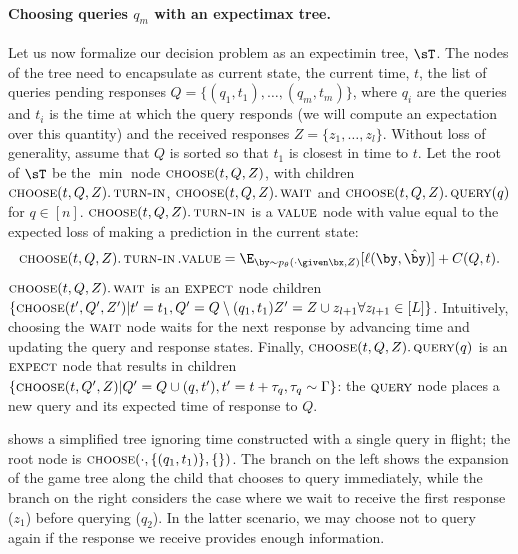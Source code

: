 \paragraph{Choosing queries $q_m$ with an expectimax tree.}
Let us now formalize our decision problem as an expectimin tree, $\sT$.
The nodes of the tree need to encapsulate as current state, the current time, $t$, the list of queries pending responses $Q = \{(q_1, t_1), \ldots, (q_m, t_m)\}$, where $q_i$ are the queries and $t_i$ is the time at which the query responds (we will compute an expectation over this quantity) and the received responses $Z = \{z_1, \ldots, z_l\}$.
Without loss of generality, assume that $Q$ is sorted so that $t_1$ is closest in time to $t$.
Let the root of $\sT$ be the $\min$ node $\operatorname{\textsc{choose}}(t, Q, Z)$, 
with children $\operatorname{\textsc{choose}}(t, Q, Z).\operatorname{\textsc{turn-in}}$, $\operatorname{\textsc{choose}}(t, Q, Z).\operatorname{\textsc{wait}}$ and $\operatorname{\textsc{choose}}(t, Q, Z).\operatorname{\textsc{query}}(q)$ for $q \in [n]$.
$\operatorname{\textsc{choose}}(t, Q, Z).\operatorname{\textsc{turn-in}}$ is a $\textsc{value}$ node with value equal to the expected loss of making a prediction in the current state:
\[
\scchoose(t, Q, Z).\turnin.\scvalue 
= \E_{\by \sim \p(\cdot \given \bx, Z)}[\ell(\by, \byt)] + C(Q, t).
\]
$\operatorname{\textsc{choose}}(t, Q, Z).\operatorname{\textsc{wait}}$ is an $\textsc{expect}$ node children $\{\operatorname{\textsc{choose}}(t', Q', Z') | t' = t_1, Q' = Q \setminus (q_1, t_1) Z' = Z \cup {z_{l+1}} \forall z_{l+1} \in [L]\}$.
Intuitively, choosing the $\operatorname{\textsc{wait}}$ node waits for the next response by advancing time and updating the query and response states.
Finally,
$\operatorname{\textsc{choose}}(t, Q, Z).\operatorname{\textsc{query}}(q)$ is an $\textsc{expect}$ node that results in children 
$\{\operatorname{\textsc{choose}}(t, Q', Z) | Q' = Q \cup (q, t'), t' = t + \tau_q, \tau_q \sim \Gamma\}$: the $\operatorname{\textsc{query}}$ node places a new query and its expected time of response to $Q$. 

 shows a simplified tree ignoring time constructed with a single query in flight; the root node is $\operatorname{\textsc{choose}}(\cdot, \{(q_1, t_1)\}, \{\})$. The branch on the left shows the expansion of the game tree along the child that chooses to query immediately, while the branch on the right considers the case where we wait to receive the first response ($z_1$) before querying ($q_2$).
In the latter scenario, we may choose not to query again if the response we receive provides enough information.


